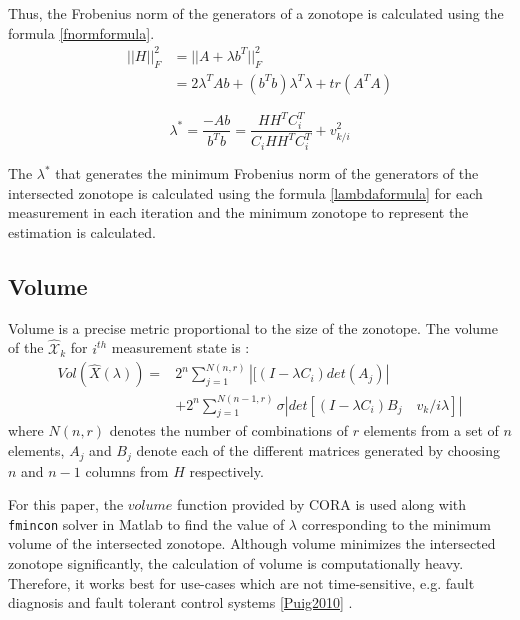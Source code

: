Thus, the Frobenius norm of the generators of a zonotope is calculated using the formula \eqref{fnormformula}\cite{Alamo2005}.
\begin{equation}
\label{fnormformula}
\begin{split}
||H||_{F}^2 & = ||A + \lambda b^T||^{2}_F \\
&= 2\lambda^T A b+ (b^Tb)\lambda^T\lambda + tr(A^TA)
\end{split}
\end{equation}

\begin{equation}
\label{lambdaformula}
\lambda^* = \frac{-Ab }{b^Tb}  = \frac{HH^TC_i^T}{C_i HH^TC_i^T} + v_{k/i}^2
\end{equation}

The $\lambda^*$ that generates the minimum Frobenius norm of the generators of the intersected zonotope is calculated using the formula \eqref{lambdaformula} for each measurement in each iteration and the minimum zonotope to represent the estimation is calculated.

\subsection{Volume}
Volume is a precise metric proportional to the size of the zonotope. The volume of the $\mathcal{\hat{X}}_k$ for $i^{th}$ measurement state is \cite{Alamo2005}:
\begin{equation}
\label{volumeformula}
\begin{split}
Vol(\hat{X}(\lambda))=& 2^n \sum^{N(n,r)}_{j=1} |[(I - \lambda C_i)det(A_j)|\\
&+ 2^n \sum^{N(n-1,r)}_{j=1} \sigma|det[(I- \lambda C_i)B_j\quad v_k/i\lambda]|
\end{split}
\end{equation}
where $N(n,r)$ denotes the number of combinations of $r$ elements from a set of $n$ elements, $A_j$ and $B_j$ denote each of the different matrices generated by choosing $n$ and $n-1$ columns from $H$ respectively. 

For this paper, the $volume$ function provided by CORA is used along with \texttt{fmincon} solver in Matlab to find the value of $\lambda$ corresponding to the minimum volume of the intersected zonotope. Although volume minimizes the intersected zonotope significantly, the calculation of volume is computationally heavy. Therefore, it works best for use-cases which are not time-sensitive, e.g. fault diagnosis and fault tolerant control systems \ref{Puig2010} . 


